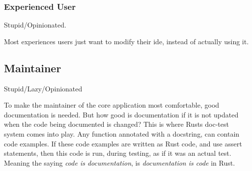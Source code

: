 \subsubsection{Experienced User}

Stupid/Opinionated.

Most experiences users just want to modify their \gls{ide}, instead of actually
using it.

\subsection{Maintainer}

Stupid/Lazy/Opinionated

To make the maintainer of the core application most comfortable, good
documentation is needed. But how good is documentation if it is not updated
when the code being documented is changed? This is where Rusts doc-test system
comes into play. Any function annotated with a docstring, can contain code
examples. If these code examples are written as Rust code, and use assert
statements, then this code is run, during testing, as if it was an actual test.
Meaning the saying \textit{code is documentation}, is
\textit{documentation is code} in Rust.

